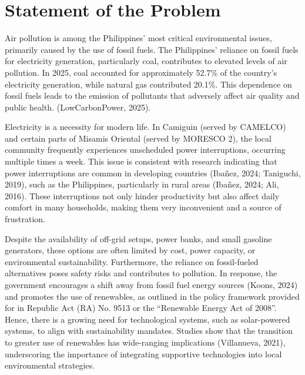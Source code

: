 {\section{Statement of the Problem}

Air pollution is among the Philippines' most critical environmental issues, primarily caused by the use of fossil fuels. The Philippines' reliance on fossil fuels for electricity generation, particularly coal, contributes to elevated levels of air pollution. In 2025, coal accounted for approximately 52.7\% of the country's electricity generation, while natural gas contributed 20.1\%. This dependence on fossil fuels leads to the emission of pollutants that adversely affect air quality and public health. (LowCarbonPower, 2025). 

Electricity is a necessity for modern life. In Camiguin (served by CAMELCO) and certain parts of Misamis Oriental (served by MORESCO 2), the local community frequently experiences unscheduled power interruptions, occurring multiple times a week. This issue is consistent with research indicating that power interruptions are common in developing countries (Ibañez, 2024; Taniguchi, 2019), such as the Philippines, particularly in rural areas (Ibañez, 2024; Ali, 2016). These interruptions not only hinder productivity but also affect daily comfort in many households, making them very inconvenient and a source of frustration.

Despite the availability of off-grid setups, power banks, and small gasoline generators, these options are often limited by cost, power capacity, or environmental sustainability.  Furthermore, the reliance on fossil-fueled alternatives poses safety risks and contributes to pollution. In response, the government encourages a shift away from fossil fuel energy sources (Koons, 2024) and promotes the use of renewables, as outlined in the policy framework provided for in Republic Act (RA) No. 9513 or the “Renewable Energy Act of 2008”. Hence, there is a growing need for technological systems, such as solar-powered systems, to align with sustainability mandates. Studies show that the transition to greater use of renewables has wide-ranging implications (Villanueva, 2021), underscoring the importance of integrating supportive technologies into local environmental strategies.

}
